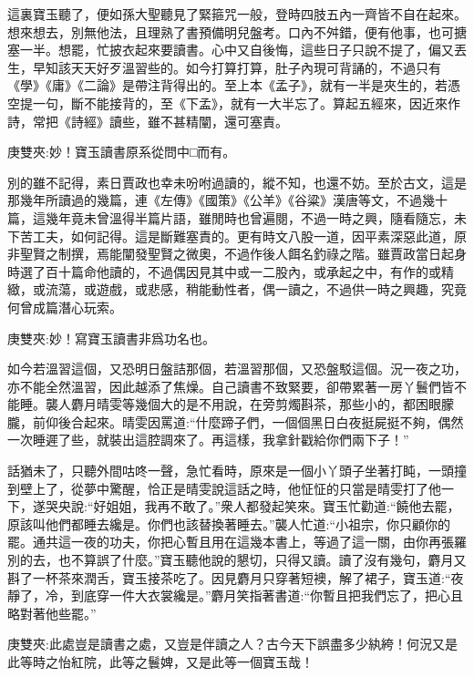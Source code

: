 \begin{parag}
    這裏寶玉聽了，便如孫大聖聽見了緊箍咒一般，登時四肢五內一齊皆不自在起來。想來想去，別無他法，且理熟了書預備明兒盤考。口內不舛錯，便有他事，也可搪塞一半。想罷，忙披衣起來要讀書。心中又自後悔，這些日子只說不提了，偏又丟生，早知該天天好歹溫習些的。如今打算打算，肚子內現可背誦的，不過只有《學》《庸》《二論》是帶注背得出的。至上本《孟子》，就有一半是夾生的，若憑空提一句，斷不能接背的，至《下孟》，就有一大半忘了。算起五經來，因近來作詩，常把《詩經》讀些，雖不甚精闡，還可塞責。\begin{note}庚雙夾:妙！寶玉讀書原系從問中□而有。\end{note}別的雖不記得，素日賈政也幸未吩咐過讀的，縱不知，也還不妨。至於古文，這是那幾年所讀過的幾篇，連《左傳》《國策》《公羊》《谷粱》漢唐等文，不過幾十篇，這幾年竟未曾溫得半篇片語，雖閒時也曾遍閱，不過一時之興，隨看隨忘，未下苦工夫，如何記得。這是斷難塞責的。更有時文八股一道，因平素深惡此道，原非聖賢之制撰，焉能闡發聖賢之微奧，不過作後人餌名釣祿之階。雖賈政當日起身時選了百十篇命他讀的，不過偶因見其中或一二股內，或承起之中，有作的或精緻，或流蕩，或遊戲，或悲感，稍能動性者，偶一讀之，不過供一時之興趣，究竟何曾成篇潛心玩索。\begin{note}庚雙夾:妙！寫寶玉讀書非爲功名也。\end{note}如今若溫習這個，又恐明日盤詰那個，若溫習那個，又恐盤駁這個。況一夜之功，亦不能全然溫習，因此越添了焦燥。自己讀書不致緊要，卻帶累著一房丫鬟們皆不能睡。襲人麝月晴雯等幾個大的是不用說，在旁剪燭斟茶，那些小的，都困眼朦朧，前仰後合起來。晴雯因罵道:“什麼蹄子們，一個個黑日白夜挺屍挺不夠，偶然一次睡遲了些，就裝出這腔調來了。再這樣，我拿針戳給你們兩下子！”
\end{parag}


\begin{parag}
    話猶未了，只聽外間咕咚一聲，急忙看時，原來是一個小丫頭子坐著打盹，一頭撞到壁上了，從夢中驚醒，恰正是晴雯說這話之時，他怔怔的只當是晴雯打了他一下，遂哭央說:“好姐姐，我再不敢了。”衆人都發起笑來。寶玉忙勸道:“饒他去罷，原該叫他們都睡去纔是。你們也該替換著睡去。”襲人忙道:“小祖宗，你只顧你的罷。通共這一夜的功夫，你把心暫且用在這幾本書上，等過了這一關，由你再張羅別的去，也不算誤了什麼。”寶玉聽他說的懇切，只得又讀。讀了沒有幾句，麝月又斟了一杯茶來潤舌，寶玉接茶吃了。因見麝月只穿著短襖，解了裙子，寶玉道:“夜靜了，冷，到底穿一件大衣裳纔是。”麝月笑指著書道:“你暫且把我們忘了，把心且略對著他些罷。”\begin{note}庚雙夾:此處豈是讀書之處，又豈是伴讀之人？古今天下誤盡多少紈絝！何況又是此等時之怡紅院，此等之鬟婢，又是此等一個寶玉哉！\end{note}
\end{parag}



